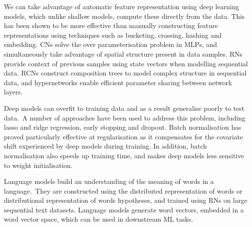 \noindent We can take advantage of automatic feature representation using deep learning models, which unlike shallow models, compute these directly from the data. This has been shown to be more effective than manually constructing feature representations using techniques such as bucketing, crossing, hashing and embedding. CNs solve the over parameterisation problem in MLPs, and simultaneously take advantage of spatial structure present in data samples. RNs provide context of previous samples using state vectors when modelling sequential data. RCNs construct composition trees to model complex structure in sequential data, and hypernetworks enable efficient parameter sharing between network layers. \par

\noindent Deep models can overfit to training data and as a result generalise poorly to test data.\ A number of approaches have been used to address this problem, including lasso and ridge regression, early stopping and dropout. Batch normalisation has proved particularly effective at regularisation as it compensates for the covariate shift experienced by deep models during training. In addition, batch normalisation also speeds up training time, and makes deep models less sensitive to weight initialisation. \par

\noindent Language models build an understanding of the meaning of words in a language.\ They are constructed using the distributed representation of words or distributional representation of words hypotheses, and trained using RNs on large sequential text datasets. Language models generate word vectors, embedded in a word vector space, which can be used in downstream ML tasks. 

